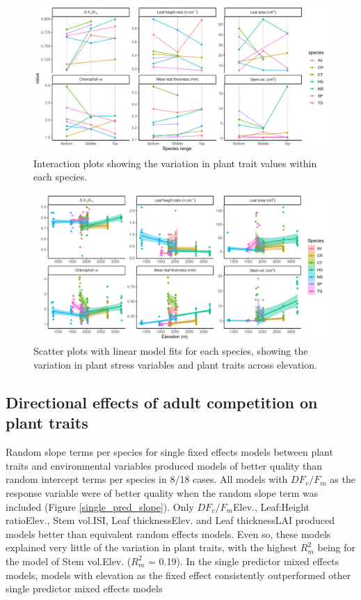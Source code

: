 \documentclass[a4paper, 11pt]{article}
\newcommand{\textapprox}{\raisebox{0.5ex}{\texttildelow}}
\begin{document}
\begin{figure}[H]
\includegraphics[width=\textwidth]{spaghetti}
\centering
\caption{Interaction plots showing the variation in plant trait values within each species.}
\label{fig:spaghetti}
\end{figure}


\begin{figure}[H]
\includegraphics[width=\textwidth]{traits_elev_scatter}
\centering
\caption{Scatter plots with linear model fits for each species, showing the variation in plant stress variables and plant traits across elevation.}
\label{fig:traits_elev_scatter}
\end{figure}

\subsection{Directional effects of adult competition on plant traits}

Random slope terms per species for single fixed effects models between plant traits and environmental variables produced models of better quality than random intercept terms per species in 8/18 cases. All models with $D F_v/F_m$ as the response variable were of better quality when the random slope term was included (Figure \ref{single_pred_slope}). Only $D F_v/F_m$\textapprox{}Elev., Leaf:Height ratio\textapprox{}Elev., Stem vol.\textapprox{}ISI, Leaf thickness\textapprox{}Elev. and Leaf thickness\textapprox{}LAI produced models better than equivalent random effects models. Even so, these models explained very little of the variation in plant traits, with the highest $R^2_m$ being for the model of Stem vol.\textapprox{}Elev. ($R^2_m$ = 0.19). In the single predictor mixed effects models, models with elevation as the fixed effect consistently outperformed other single predictor mixed effects models
\end{document}
